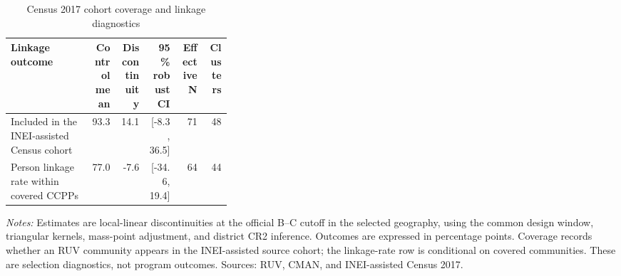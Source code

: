 \begin{table}[!htbp]
\centering
\small
\caption{Census 2017 cohort coverage and linkage diagnostics}
\label{tab:rd_outcomes_linkage_2017_ccpp}
\begin{tabular}{p{0.36\linewidth}rrrrr}
\toprule
Linkage outcome & Control mean & Discontinuity & 95\% robust CI & Effective N & Clusters \\
\midrule
Included in the INEI-assisted Census cohort & 93.3 & 14.1 & [-8.3, 36.5] & 71 & 48 \\
Person linkage rate within covered CCPPs & 77.0 & -7.6 & [-34.6, 19.4] & 64 & 44 \\
\bottomrule
\end{tabular}
\parbox{0.97\linewidth}{\footnotesize \textit{Notes:} Estimates are local-linear discontinuities at the official B--C cutoff in the selected geography, using the common design window, triangular kernels, mass-point adjustment, and district CR2 inference. Outcomes are expressed in percentage points. Coverage records whether an RUV community appears in the INEI-assisted source cohort; the linkage-rate row is conditional on covered communities. These are selection diagnostics, not program outcomes. Sources: RUV, CMAN, and INEI-assisted Census 2017.}
\end{table}
